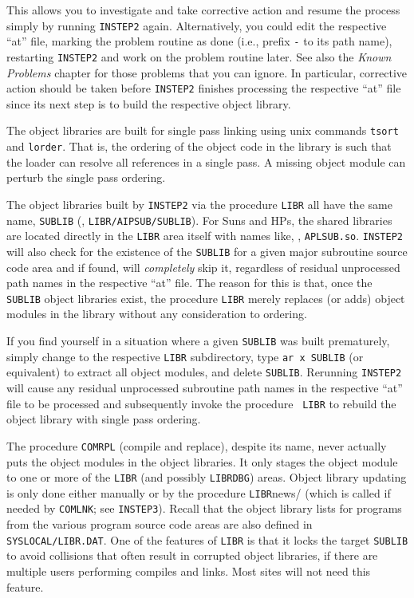 This allows you to investigate and take corrective action and resume the
process simply by running {\tt INSTEP2} again.  Alternatively, you could
edit the respective ``at'' file, marking the problem routine as done
(i.e., prefix {\tt -} to its path name), restarting {\tt INSTEP2} and
work on the problem routine later.  See also the {\it Known Problems\/}
chapter for those problems that you can ignore.  In particular,
corrective action should be taken before {\tt INSTEP2} finishes
processing the respective ``at'' file since its next step is to build
the respective object library.

The object libraries are built for single pass linking using unix
commands {\tt tsort} and {\tt lorder}.  That is, the ordering of the
object code in the library is such that the loader can resolve all
references in a single pass.  A missing object module can perturb the
single pass ordering.

The object libraries built by {\tt INSTEP2} via the procedure {\tt LIBR}
all have the same name, {\tt SUBLIB} (\eg, {\tt\dol LIBR/AIPSUB/SUBLIB}).
For Suns and HPs, the shared libraries are located directly in the
{\tt\dol LIBR} area itself with names like, \eg, {\tt APLSUB.so}.
{\tt INSTEP2} will also check for the existence of the {\tt SUBLIB} for
a given major subroutine source code area and if found, will {\it
completely\/} skip it, regardless of residual unprocessed path names in
the respective ``at'' file.  The reason for this is that, once the {\tt
SUBLIB} object libraries exist, the procedure {\tt LIBR} merely replaces
(or adds) object modules in the library without any consideration to
ordering.

If you find yourself in a situation where a given {\tt SUBLIB} was
built prematurely, simply change to the respective {\tt\dol LIBR}
subdirectory, type {\tt ar x SUBLIB} (or equivalent) to extract all
object modules, and delete {\tt SUBLIB}.  Rerunning {\tt INSTEP2} will
cause any residual unprocessed subroutine path names in the respective
``at'' file to be processed and subsequently invoke the procedure {\tt
LIBR} to rebuild the object library with single pass ordering.

The procedure {\tt COMRPL} (compile and replace), despite its name,
never actually puts the object modules in the object libraries.  It only
stages the object module to one or more of the {\tt \dol LIBR} (and
possibly {\tt \dol LIBRDBG}) areas.  Object library updating is only done
either manually or by the procedure {\tt LIBR}news/ (which is called if
needed by {\tt COMLNK}; see {\tt INSTEP3}).  Recall that the object
library lists for programs from the various program source code areas
are also defined in {\tt\dol SYSLOCAL/LIBR.DAT}.  One of the features of
{\tt LIBR} is that it locks the target {\tt SUBLIB} to avoid collisions
that often result in corrupted object libraries, if there are multiple
users performing compiles and links.  Most sites will not need this
feature.

